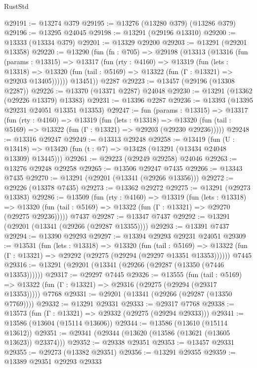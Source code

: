 \begin{lexlean}{RustStd}
\begin{coremodule}
@29191 := @13274 @379
@29195 := @13276 (@13280 @379) (@13286 @379)
@29196 := @13295 @24045
@29198 := @13291 (@29196 @13310)
@29200 := @13333 (@13334 @379)
@29201 := @13329 @29200
@29203 := @13291 (@29201 @13358)
@29220 := @13290
    (fun (fn : @705) =>
    @29198
      (@13313
        (@13316
          (fun (params : @13315) =>
          @13317
            (fun (rty : @4160) =>
            @13319
              (fun (lets : @13318) =>
              @13320 (fun (tail : @5169) => @13322 (fun (Γ : @13321) => @29203 @13405))))))
        @13451))
    @2287
@29223 := @13457 (@29196 (@13308 @2287))
@29226 := @13370 (@13371 @2287) @24048
@29230 := @13291 (@13362 (@29226 @13379) @13383)
@29231 := @13396 @2287
@29236 := @13393 (@13395 @29231 @24051 @13351 @13353)
@29247 := fun (params : @13315) =>
  @13317
    (fun (rty : @4160) =>
    @13319
      (fun (lets : @13318) =>
      @13320 (fun (tail : @5169) => @13322 (fun (Γ : @13321) => @29203 (@29230 @29236)))))
@29248 := @13316 @29247
@29249 := @13313 @29248
@29258 := @13419
    (fun (U : @13418) => @13420 (fun (t : @7) => @13428 (@13291 (@13434 @24048 @13309) @13445)))
@29261 := @29223 (@29249 @29258) @24046
@29263 := @13276 @29248 @29258
@29265 := @13506 @29247 @7435
@29266 := @13343 @7435
@29270 := @13291 (@29201 (@13341 (@29266 @13356)))
@29272 := @29226 (@13378 @7435)
@29273 := @13362 @29272
@29275 := @13291 (@29273 @13383)
@29286 := @13509
    (fun (rty : @4160) =>
    @13319
      (fun (lets : @13318) =>
      @13320 (fun (tail : @5169) => @13322 (fun (Γ : @13321) => @29270 (@29275 @29236)))))
    @7437
@29287 := @13347 @7437
@29292 := @13291 (@29201 (@13341 (@29266 (@29287 @13355))))
@29293 := @13391 @7437
@29294 := @13390 @29293
@29297 := @13394 @29293 @29231 @24051
@29309 := @13531
    (fun (lets : @13318) =>
    @13320
      (fun (tail : @5169) =>
      @13322 (fun (Γ : @13321) => @29292 (@29275 (@29294 (@29297 @13351 @13353))))))
    @7445
@29316 := @13291 (@29201 (@13341 (@29266 (@29287 (@13350 (@7446 @13353))))))
@29317 := @29297 @7445
@29326 := @13555
    (fun (tail : @5169) => @13322 (fun (Γ : @13321) => @29316 (@29275 (@29294 (@29317 @13353)))))
    @7768
@29331 := @29201 (@13341 (@29266 (@29287 (@13350 @7769))))
@29332 := @13291 @29331
@29333 := @29317 @7768
@29338 := @13573 (fun (Γ : @13321) => @29332 (@29275 (@29294 @29333)))
@29341 := @13586 (@13604 (@15114 @13606))
@29344 := @13586 (@13610 (@15114 @13612))
@29351 := @29341 (@29344 (@13620 (@13586 (@13621 (@13605 @13623)) @23374)))
@29352 := @29338 @29351
@29353 := @13457 @29331
@29355 := @29273 (@13382 @29351)
@29356 := @13291 @29355
@29359 := @13389 @29351 @29293 @29333

\end{coremodule}
\end{lexlean}
